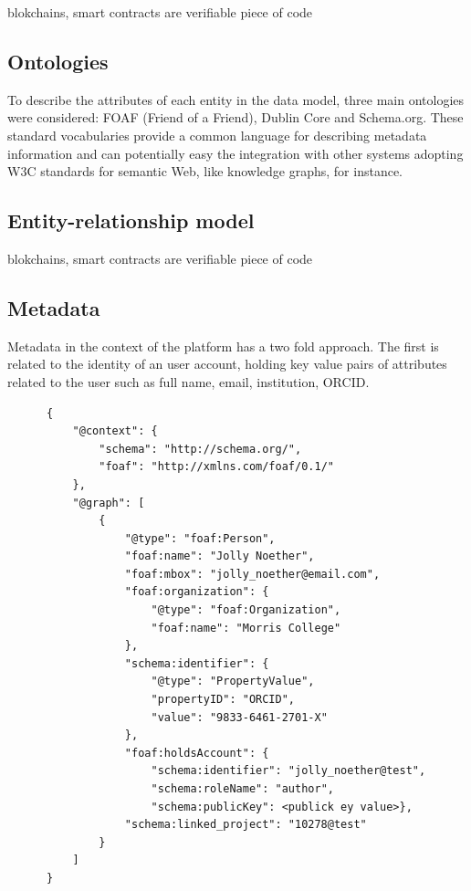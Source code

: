 \documentclass{article}
\begin{document}
blokchains, smart contracts are verifiable piece of code

\subsection{Ontologies}

To describe the attributes of each entity in the data model, three main ontologies were considered: FOAF (Friend of a Friend), Dublin Core and Schema.org. These standard vocabularies provide a common language for describing metadata information and can potentially easy the integration with other systems adopting W3C standards for semantic Web, like knowledge graphs, for instance.

\subsection{Entity-relationship model}


blokchains, smart contracts are verifiable piece of code


\subsection{Metadata}

Metadata in the context of the platform has a two fold approach. The first is related to the identity of an user account, holding key value pairs of attributes related to the user such as full name, email, institution, ORCID.


\begin{verbatim}
      {
          "@context": {
              "schema": "http://schema.org/",
              "foaf": "http://xmlns.com/foaf/0.1/"
          },
          "@graph": [
              {
                  "@type": "foaf:Person",
                  "foaf:name": "Jolly Noether",
                  "foaf:mbox": "jolly_noether@email.com",
                  "foaf:organization": {
                      "@type": "foaf:Organization",
                      "foaf:name": "Morris College"
                  },
                  "schema:identifier": {
                      "@type": "PropertyValue",
                      "propertyID": "ORCID",
                      "value": "9833-6461-2701-X"
                  },
                  "foaf:holdsAccount": {
                      "schema:identifier": "jolly_noether@test",
                      "schema:roleName": "author",
                      "schema:publicKey": <publick ey value>},
                  "schema:linked_project": "10278@test"
              }
          ]
      }
      \end{verbatim}
\end{document}
